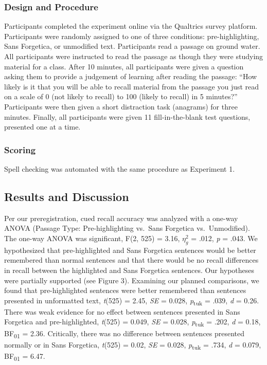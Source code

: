 \documentclass[
  english,
  jou]{apa6}
\begin{document}
\hypertarget{design-and-procedure}{%
\subsubsection{Design and Procedure}\label{design-and-procedure}}

Participants completed the experiment online via the Qualtrics survey platform. Participants were randomly assigned to one of three conditions: pre-highlighting, Sans Forgetica, or unmodified text. Participants read a passage on ground water. All participants were instructed to read the passage as though they were studying material for a class. After 10 minutes, all participants were given a question asking them to provide a judgement of learning after reading the passage: \enquote{How likely is it that you will be able to recall material from the passage you just read on a scale of 0 (not likely to recall) to 100 (likely to recall) in 5 minutes?} Participants were then given a short distraction task (anagrams) for three minutes. Finally, all participants were given 11 fill-in-the-blank test questions, presented one at a time.

\hypertarget{scoring-1}{%
\subsubsection{Scoring}\label{scoring-1}}

Spell checking was automated with the same procedure as Experiment 1.

\hypertarget{results-and-discussion-1}{%
\subsection{Results and Discussion}\label{results-and-discussion-1}}

Per our preregistration, cued recall accuracy was analyzed with a one-way ANOVA (Passage Type: Pre-highlighting vs.~Sans Forgetica vs.~Unmodified). The one-way ANOVA was significant, F(2, 525) = 3.16, \(\eta_{g}^{2}\) = .012, \emph{p} = .043. We hypothesized that pre-highlighted and Sans Forgetica sentences would be better remembered than normal sentences and that there would be no recall differences in recall between the highlighted and Sans Forgetica sentences. Our hypotheses were partially supported (see Figure 3). Examining our planned comparisons, we found that pre-highlighted sentences were better remembered than sentences presented in unformatted text, \emph{t}(525) = 2.45, \emph{SE} = 0.028, \emph{p}\textsubscript{tuk} = .039, \emph{d} = 0.26. There was weak evidence for no effect between sentences presented in Sans Forgetica and pre-highlighted, \emph{t}(525) = 0.049, \emph{SE} = 0.028, \emph{p}\textsubscript{tuk} = .202, \emph{d} = 0.18, BF\textsubscript{01} = 2.36. Critically, there was no difference between sentences presented normally or in Sans Forgetica, \emph{t}(525) = 0.02, \emph{SE} = 0.028, \emph{p}\textsubscript{tuk} = .734, \emph{d} = 0.079, BF\textsubscript{01} = 6.47.
\end{document}
